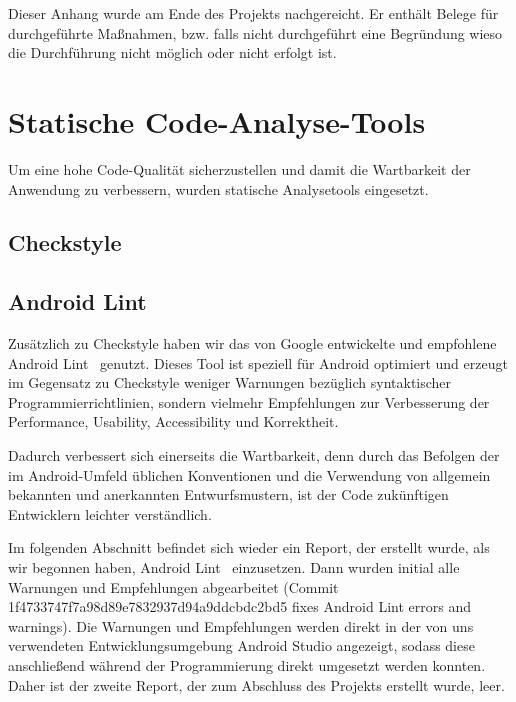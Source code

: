 
    Dieser Anhang wurde am Ende des Projekts nachgereicht. Er enthält Belege für
    durchgeführte Maßnahmen, bzw. falls nicht durchgeführt eine Begründung wieso
    die Durchführung nicht möglich oder nicht erfolgt ist. \\



\section{Statische Code-Analyse-Tools}

Um eine hohe Code-Qualität sicherzustellen und damit die Wartbarkeit der
Anwendung zu verbessern, wurden statische Analysetools eingesetzt.

\subsection{Checkstyle}



\clearpage
\subsection{Android Lint}

Zusätzlich zu Checkstyle haben wir das von Google entwickelte und empfohlene \glqq Android Lint\grqq~ genutzt. Dieses Tool ist speziell für Android optimiert und erzeugt im Gegensatz zu Checkstyle weniger Warnungen bezüglich syntaktischer Programmierrichtlinien, sondern vielmehr Empfehlungen zur Verbesserung der Performance, Usability, Accessibility und Korrektheit.

Dadurch verbessert sich einerseits die Wartbarkeit, denn durch das Befolgen der im Android-Umfeld üblichen Konventionen und die Verwendung von allgemein bekannten und anerkannten Entwurfsmustern, ist der Code zukünftigen Entwicklern leichter verständlich.

Im folgenden Abschnitt befindet sich wieder ein Report, der erstellt wurde, als wir begonnen haben, \glqq Android Lint\grqq~ einzusetzen. Dann wurden initial alle Warnungen und Empfehlungen abgearbeitet (Commit 1f4733747f7a98d89e7832937d94a9ddcbdc2bd5 \glqq fixes Android Lint errors and warnings\grqq). Die Warnungen und Empfehlungen werden direkt in der von uns verwendeten Entwicklungsumgebung Android Studio angezeigt, sodass diese anschließend während der Programmierung direkt umgesetzt werden konnten. Daher ist der zweite Report, der zum Abschluss des Projekts erstellt wurde, leer.

